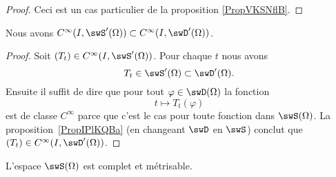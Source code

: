 \begin{proof}
	Ceci est un cas particulier de la proposition \ref{PropVKSNflB}.
\end{proof}

\begin{lemma}		\label{LEMooFTRNooNqFplH}
	Nous avons \(  C^{\infty}(I,\swS'(\Omega))\subset C^{\infty}(I,\swD'(\Omega))\).
\end{lemma}

\begin{proof}
	Soit \( (T_t)\in C^{\infty}(I,\swS'(\Omega))\). Pour chaque \( t\) nous avons
	\begin{equation}
		T_t\in\swS'(\Omega)\subset\swD'(\Omega).
	\end{equation}
	Ensuite il suffit de dire que pour tout \( \varphi\in\swD(\Omega)\) la fonction
	\begin{equation}
		t\mapsto T_t(\varphi)
	\end{equation}
	est de classe \(  C^{\infty}\) parce que c'est le cas pour toute fonction dans \( \swS(\Omega)\). La proposition~\ref{PropIPlKQBa} (en changeant \( \swD\) en \( \swS\)) conclut que \( (T_t)\in C^{\infty}(I,\swD'(\Omega))\).
\end{proof}

\begin{proposition} \label{PropIIAcyDq}
	L'espace \( \swS(\Omega)\) est complet et métrisable.
\end{proposition}

